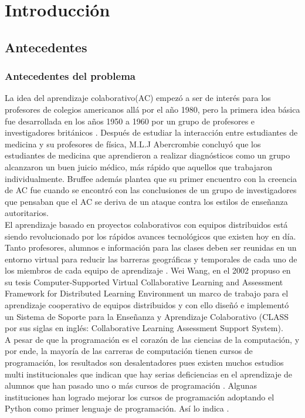 
\chapter{Introducción}
\label{cap:introduccion}
\section{Antecedentes}
\subsection{Antecedentes del problema}
La idea del aprendizaje colaborativo(AC) empezó a ser de interés para los profesores de colegios americanos allá por el año 1980, pero la primera idea básica fue desarrollada en los años 1950 a 1960 por un grupo de profesores e investigadores británicos \cite{bruffee_collaborative_1984}. Después de estudiar la interacción entre estudiantes de medicina y su profesores de física, M.L.J Abercrombie concluyó que los estudiantes de medicina que aprendieron a realizar diagnósticos como un grupo alcanzaron un buen juicio médico, más rápido que aquellos que trabajaron individualmente. Bruffee además plantea que su primer encuentro con la creencia de AC fue cuando se encontró con las conclusiones de un grupo de investigadores que pensaban que el AC se deriva de un ataque contra los estilos de enseñanza autoritarios.\\

El aprendizaje basado en proyectos colaborativos con equipos distribuidos está siendo revolucionado por los rápidos avances tecnológicos que existen hoy en día. Tanto profesores, alumnos e información para las clases deben ser reunidas en un entorno virtual para reducir las barreras geográficas y temporales de cada uno de los miembros de cada equipo de aprendizaje \cite{wang_computer-supported_2002}. Wei Wang, en el 2002 propuso en su tesis Computer-Supported Virtual Collaborative Learning and Assessment Framework for Distributed Learning Environment un marco de trabajo para el aprendizaje cooperativo de equipos distribuidos y con ello diseñó e implementó un Sistema de Soporte para la Enseñanza y Aprendizaje Colaborativo (CLASS por sus siglas en inglés: Collaborative Learning Assessment Support System).\\

A pesar de que la programación es el corazón de las ciencias de la computación, y por ende, la mayoría de las carreras de computación tienen cursos de programación, los resultados son desalentadores pues existen muchos estudios multi institucionales que indican que hay serias deficiencias en el aprendizaje de alumnos que han pasado uno o más cursos de programación \cite{mccracken_multi-national_2001,lister_multi-national_2004,Tenenberg_studentsdesigning_2005}. Algunas instituciones han logrado mejorar los cursos de programación adoptando el Python como primer lenguaje de programación. Así lo indica .\\



